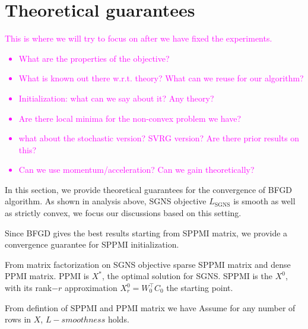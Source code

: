 \documentclass[letterpaper]{article} %
\begin{document}
\section{Theoretical guarantees}
\textcolor{magenta}{This is where we will try to focus on after we have fixed the experiments. 
\begin{itemize}
\item What are the properties of the objective?
\item What is known out there w.r.t. theory? What can we reuse for our algorithm?
\item Initialization: what can we say about it? Any theory?
\item Are there local minima for the non-convex problem we have?
\item what about the stochastic version? SVRG version? Are there prior results on this?
\item Can we use momentum/acceleration? Can we gain theoretically?
\end{itemize}}
In this section, we provide theoretical guarantees for the convergence of BFGD algorithm. As shown in analysis above, SGNS objective $L_\text{SGNS}$ is smooth as well as strictly convex, we focus our discussions based on this setting.

Since BFGD gives the best results starting from SPPMI matrix, we provide a convergence guarantee for SPPMI initialization.

From matrix factorization on SGNS objective \cite{levy2014neural} sparse SPPMI matrix and dense PPMI matrix. PPMI is $X^*$, the optimal solution for SGNS. SPPMI is the $X^0$, with its rank$-r$ approximation $X_r^0=W_0^\top C_0$ the starting point.

From defintion of SPPMI and PPMI matrix we have
Assume for any number of rows in $X$, $L-smoothness$ holds.
\end{document}
